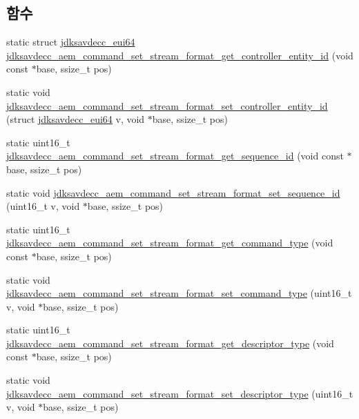\subsection*{함수}
\begin{DoxyCompactItemize}
\item 
static struct \hyperlink{structjdksavdecc__eui64}{jdksavdecc\+\_\+eui64} \hyperlink{group__command__set__stream__format_ga78a7633e6a4bd83358bffa90e636256d}{jdksavdecc\+\_\+aem\+\_\+command\+\_\+set\+\_\+stream\+\_\+format\+\_\+get\+\_\+controller\+\_\+entity\+\_\+id} (void const $\ast$base, ssize\+\_\+t pos)
\item 
static void \hyperlink{group__command__set__stream__format_gaafec59cb58352d2131f20fbc5104f239}{jdksavdecc\+\_\+aem\+\_\+command\+\_\+set\+\_\+stream\+\_\+format\+\_\+set\+\_\+controller\+\_\+entity\+\_\+id} (struct \hyperlink{structjdksavdecc__eui64}{jdksavdecc\+\_\+eui64} v, void $\ast$base, ssize\+\_\+t pos)
\item 
static uint16\+\_\+t \hyperlink{group__command__set__stream__format_ga2410ed2b3cff7786038483317d5d0b44}{jdksavdecc\+\_\+aem\+\_\+command\+\_\+set\+\_\+stream\+\_\+format\+\_\+get\+\_\+sequence\+\_\+id} (void const $\ast$base, ssize\+\_\+t pos)
\item 
static void \hyperlink{group__command__set__stream__format_ga1e364569c908f7546057c771e4d72539}{jdksavdecc\+\_\+aem\+\_\+command\+\_\+set\+\_\+stream\+\_\+format\+\_\+set\+\_\+sequence\+\_\+id} (uint16\+\_\+t v, void $\ast$base, ssize\+\_\+t pos)
\item 
static uint16\+\_\+t \hyperlink{group__command__set__stream__format_ga0b8b7f4f2ec415aeea386b552c968447}{jdksavdecc\+\_\+aem\+\_\+command\+\_\+set\+\_\+stream\+\_\+format\+\_\+get\+\_\+command\+\_\+type} (void const $\ast$base, ssize\+\_\+t pos)
\item 
static void \hyperlink{group__command__set__stream__format_ga4cbafb9a8551fb6656ea4956f1f00b92}{jdksavdecc\+\_\+aem\+\_\+command\+\_\+set\+\_\+stream\+\_\+format\+\_\+set\+\_\+command\+\_\+type} (uint16\+\_\+t v, void $\ast$base, ssize\+\_\+t pos)
\item 
static uint16\+\_\+t \hyperlink{group__command__set__stream__format_ga50d425d359f8e2d68522525d21783cb4}{jdksavdecc\+\_\+aem\+\_\+command\+\_\+set\+\_\+stream\+\_\+format\+\_\+get\+\_\+descriptor\+\_\+type} (void const $\ast$base, ssize\+\_\+t pos)
\item 
static void \hyperlink{group__command__set__stream__format_gae903701f88374d00fc86590fd25c0336}{jdksavdecc\+\_\+aem\+\_\+command\+\_\+set\+\_\+stream\+\_\+format\+\_\+set\+\_\+descriptor\+\_\+type} (uint16\+\_\+t v, void $\ast$base, ssize\+\_\+t pos)

\end{DoxyCompactItemize}
